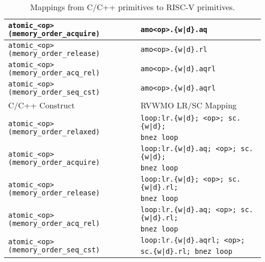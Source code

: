 \begin{table}[h!]
\begin{tabular}{|l|l|}
    \hline
    \tt atomic\_<op>(memory\_order\_acquire)  & \tt amo<op>.\{w|d\}.aq   \\
    \hline
    \tt atomic\_<op>(memory\_order\_release)  & \tt amo<op>.\{w|d\}.rl   \\
    \hline
    \tt atomic\_<op>(memory\_order\_acq\_rel) & \tt amo<op>.\{w|d\}.aqrl \\
    \hline
    \tt atomic\_<op>(memory\_order\_seq\_cst) & \tt amo<op>.\{w|d\}.aqrl \\
    \hline
    \hline
    C/C++ Construct                           & RVWMO LR/SC Mapping\\
    \hline
    \multirow{2}{*}{\tt atomic\_<op>(memory\_order\_relaxed)}
      & \tt loop:\@ lr.\{w|d\}; <op>; sc.\{w|d\}; \\
      & \tt bnez loop \\
    \hline
    \multirow{2}{*}{\tt atomic\_<op>(memory\_order\_acquire)}
      & \tt loop:\@ lr.\{w|d\}.aq; <op>; sc.\{w|d\}; \\
      & \tt bnez loop \\
    \hline
    \multirow{2}{*}{\tt atomic\_<op>(memory\_order\_release)}
      & \tt loop:\@ lr.\{w|d\}; <op>; sc.\{w|d\}.rl; \\
      & \tt bnez loop \\
    \hline
    \multirow{2}{*}{\tt atomic\_<op>(memory\_order\_acq\_rel)}
      & \tt loop:\@ lr.\{w|d\}.aq; <op>; sc.\{w|d\}.rl; \\
      & \tt bnez loop \\
    \hline
    \multirow{2}{*}{\tt atomic\_<op>(memory\_order\_seq\_cst)}
      & \tt loop:\@ lr.\{w|d\}.aqrl; <op>; \\
      & \tt sc.\{w|d\}.rl; bnez loop \\
    \hline
  \end{tabular}
  \caption{Mappings from C/C++ primitives to RISC-V primitives.}
  \label{tab:c11mappings}
\end{table}

